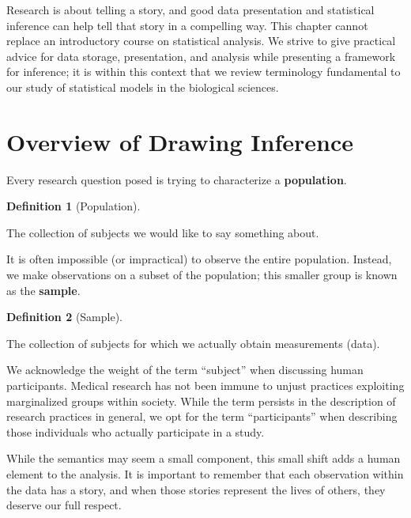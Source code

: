 \documentclass[
  letterpaper,
  DIV=11,
  numbers=noendperiod]{scrreprt}
\theoremstyle{definition}
\theoremstyle{definition}
\newtheorem{definition}{Definition}[chapter]
\theoremstyle{remark}
\begin{document}
Research is about telling a story, and good data presentation and
statistical inference can help tell that story in a compelling way. This
chapter cannot replace an introductory course on statistical analysis.
We strive to give practical advice for data storage, presentation, and
analysis while presenting a framework for inference; it is within this
context that we review terminology fundamental to our study of
statistical models in the biological sciences.

\hypertarget{overview-of-drawing-inference}{%
\section{Overview of Drawing
Inference}\label{overview-of-drawing-inference}}

Every research question posed is trying to characterize a
\textbf{population}.

\begin{definition}[Population]\protect\hypertarget{def-population}{}\label{def-population}

The collection of subjects we would like to say something about.

\end{definition}

It is often impossible (or impractical) to observe the entire
population. Instead, we make observations on a subset of the population;
this smaller group is known as the \textbf{sample}.

\begin{definition}[Sample]\protect\hypertarget{def-sample}{}\label{def-sample}

The collection of subjects for which we actually obtain measurements
(data).

\end{definition}

\begin{tcolorbox}[enhanced jigsaw, bottomrule=.15mm, titlerule=0mm, bottomtitle=1mm, colback=white, coltitle=black, rightrule=.15mm, leftrule=.75mm, toprule=.15mm, toptitle=1mm, left=2mm, opacityback=0, colframe=quarto-callout-note-color-frame, breakable, title=\textcolor{quarto-callout-note-color}{\faInfo}\hspace{0.5em}{Note}, arc=.35mm, colbacktitle=quarto-callout-note-color!10!white, opacitybacktitle=0.6]

We acknowledge the weight of the term ``subject'' when discussing human
participants. Medical research has not been immune to unjust practices
exploiting marginalized groups within society. While the term persists
in the description of research practices in general, we opt for the term
``participants'' when describing those individuals who actually
participate in a study.

While the semantics may seem a small component, this small shift adds a
human element to the analysis. It is important to remember that each
observation within the data has a story, and when those stories
represent the lives of others, they deserve our full respect.

\end{tcolorbox}
\end{document}
